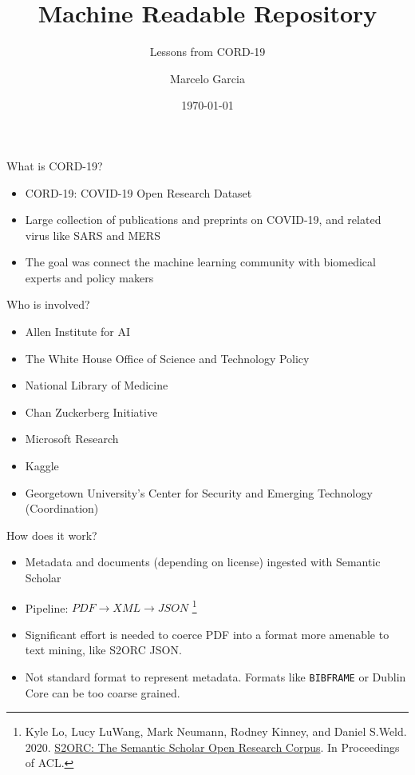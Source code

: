 \documentclass{beamer}
\title{Machine Readable Repository}
\subtitle{Lessons from CORD-19}
\author{Marcelo Garcia}
\institute{KAUST University Library}
\date{\today}
\begin{document}
\begin{frame}
\titlepage
\end{frame}

\begin{frame}{What is CORD-19?}
    \begin{itemize}
        \item CORD-19: COVID-19 Open Research Dataset
        \item Large collection of publications and preprints on COVID-19, and related virus like SARS and MERS
        \item The goal was connect the machine learning community with biomedical experts and policy makers    
    \end{itemize}
\end{frame}

\begin{frame}{Who is involved?}
    \begin{itemize}
        \item Allen Institute for AI
        \item The White House Office of Science and Technology Policy
        \item National Library of Medicine
        \item Chan Zuckerberg Initiative
        \item Microsoft Research
        \item Kaggle
        \item Georgetown University's Center for Security and Emerging Technology (Coordination)
    \end{itemize}
\end{frame}

\begin{frame}{How does it work?}
    \begin{itemize}
        \item Metadata and documents (depending on license) ingested with Semantic Scholar
        \item Pipeline: $PDF \rightarrow XML \rightarrow JSON$ \footnote{Kyle Lo, Lucy LuWang, Mark Neumann, Rodney Kinney, and Daniel S.Weld. 2020. \href{https://arxiv.org/abs/1911.02782}{S2ORC: The Semantic Scholar Open Research Corpus}. In Proceedings of ACL.}
    \end{itemize}
    \begin{tcolorbox}[colback=red!5!white,colframe=red!75!black,title=Challenges]
    \small
    \begin{itemize}
        \item Significant effort is needed to coerce PDF into a format more amenable to text mining, like S2ORC JSON.
        \item Not standard format to represent metadata. Formats like \texttt{BIBFRAME} or Dublin Core can be too coarse grained.
    \end{itemize}
    \end{tcolorbox}
    
\end{frame}
\end{document}
